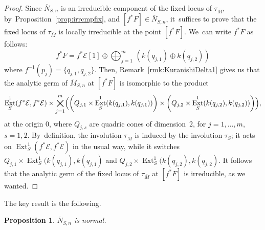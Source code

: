 \documentclass[11pt]{article}
\newcommand\cE{\mathcal{E}}
\DeclareMathOperator{\Ext}{Ext}
\let\ov\overline
\newtheorem{prop}[lemm]{Proposition}
\theoremstyle{definition}
\begin{document}
\begin{proof}
Since $\overline{N}_{S,n}$ is an irreducible component of the fixed locus of $\tau_{\overline{M}}$, by~Proposition~\ref{prop:irrcmpfix}, and $[f^*F]\in \overline{N}_{S,n}$, it~suffices to prove that the fixed locus of $\tau_{\ov{M}}$ is locally irreducible at the point $[f^*F]$. We~can write $f^*F$ as follows:\vspace*{-3pt}
\[
f^*F=f^*\cE[1]\oplus \bigoplus_{j=1}^m\, \left(k(q_{j,1})\oplus k(q_{j,2})\right)
\]
where $f^{-1}(p_j)=\{q_{j,1},q_{j,2}\}$.
Then, Remark~\ref{rmk:KuranishiDelta1} gives us that the analytic germ of $\ov{M}_{S,n}$ at $[f^*F]$ is isomorphic to the product\vspace*{-3pt}
\[
\Ext^1_S(f^*\cE,f^*\cE)\times\bigtimes_{j=1}^m \Bigl(\left(Q_{j,1}\times \Ext^1_S(k(q_{j,1}),k(q_{j,1}))\right)\times\left(Q_{j,2}\times \Ext^1_S(k(q_{j,2}),k(q_{j,2}))\right)\Bigr),
\]
at the origin $0$, where $Q_{j,s}$ are quadric cones of dimension~2, for $j=1,\dots,m$, $s=1,2$. By~definition, the involution $\tau_{\ov{M}}$ is induced by the involution $\tau_S$; it acts on $\Ext^1_S(f^*\cE,f^*\cE)$ in the usual way, while it switches $Q_{j,1}\times \Ext^1_S(k(q_{j,1}),k(q_{j,1})$ and $Q_{j,2}\times \Ext^1_S(k(q_{j,2}),k(q_{j,2})$.
It follows that the analytic germ of the fixed locus of $\tau_{\ov{M}}$ at $[f^*F]$ is irreducible, as we wanted.
\end{proof}

The key result is the following.

\begin{prop}\label{prop:ennebarnorm}
$\overline{N}_{S,n}$ is normal.
\end{prop}
\end{document}
